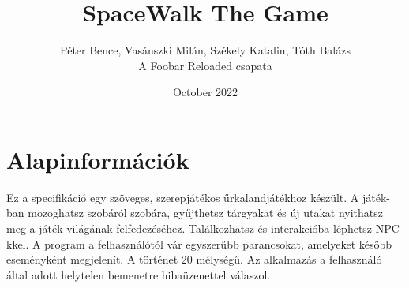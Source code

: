 \documentclass{scrarticle}
\title{SpaceWalk The Game}
\author{Péter Bence, Vasánszki Milán, Székely Katalin, Tóth Balázs\\A Foobar Reloaded csapata}
\date{October 2022}
\begin{document}
\maketitle
\newpage

\tableofcontents
\newpage

\section{Alapinformációk} 
Ez a specifikáció egy szöveges, szerepjátékos űrkalandjátékhoz készült. A játék- ban mozoghatsz szobáról szobára, gyűjthetsz tárgyakat és új utakat nyithatsz meg a játék világának felfedezéséhez. Találkozhatsz és interakcióba léphetsz NPC-kkel. A program a felhasználótól vár egyszerűbb parancsokat, amelyeket később eseményként megjelenít. A történet 20 mélységű. Az alkalmazás a felhasználó által adott helytelen bemenetre hibaüzenettel válaszol.
\end{document}
